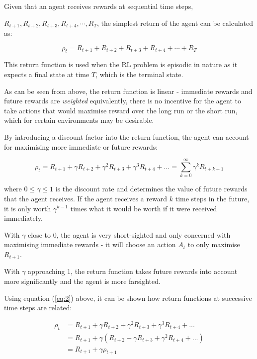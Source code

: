 \documentclass{article}
\begin{document}
Given that an agent receives rewards at sequential time steps, 

$R_{t+1}, R_{t+2}, R_{t+3}, R_{t+4}, \cdots, R_T$, the simplest return of the agent can be calculated as: 

\begin{equation} \label{eq:1}
\rho_{t} = R_{t+1} + R_{t+2} + R_{t+3} + R_{t+4} + \cdots + R_T
\end{equation}

This return function is used when the RL problem is episodic in nature as it expects a final state at time $T$, which is the terminal state.

As can be seen from above, the return function is linear - immediate rewards and future rewards are \textit{weighted} equivalently, there is no incentive for the agent to take actions that would maximise reward over the long run or the short run, which for certain environments may be desirable. 

By introducing a discount factor into the return function, the agent can account for maximising more immediate or future rewards\cite{RLNotes}: 

\begin{equation} \label{eq:2}
\rho_{t} = R_{t+1} + \gamma R_{t+2} +  \gamma^2 R_{t+3} + \gamma^3 R_{t+4}  + ... = \sum_{k=0}^{\infty} \gamma ^k R_{t+k+1}
\end{equation}

where $0 \leq \gamma \leq 1$ is the discount rate and determines the value of future rewards that the agent receives. If the agent receives a reward $k$ time steps in the future, it is only worth $\gamma^{k-1}$ times what it would be worth if it were received immediately.

With $\gamma$ close to 0, the agent is very short-sighted and only concerned with maximising immediate rewards - it will choose an action $A_t$ to only maximise $R_{t+1}$.

With $\gamma$ approaching 1, the return function takes future rewards into account more significantly and the agent is more farsighted. 

Using equation (\ref{eq:2}) above, it can be shown how return functions at successive time steps are related\cite{Sutton1998}\cite{RLNotes}:

\begin{align}
\rho_t &= R_{t+1} + \gamma R_{t+2} +  \gamma^2R_{t+3} + \gamma^3R_{t+4} + ... \nonumber \\
     &= R_{t+1} + \gamma (R_{t+2} + \gamma R_{t+3} + \gamma^2 R_{t+4} + ... )  \nonumber \\
     &= R_{t+1} + \gamma \rho_{t+1} 
\end{align}
\end{document}
